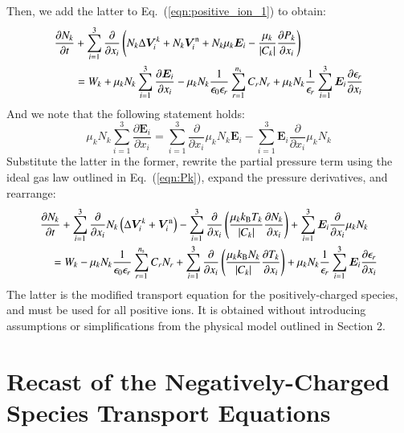 \documentclass{warpdoc}
\newcommand{\alb}{\vspace{0.1cm}\\} %
\newcommand{\mfd}{\displaystyle}
\newcommand{\ns}{{n_{\rm s}}}
\renewcommand{\vec}[1]{\bm{#1}}
\begin{document}
Then, we add the latter to Eq.\ (\ref{eqn:positive_ion_1}) to obtain:
%
\begin{align}
  \frac{\partial N_{k}}{\partial t} &+ \sum_{i=1}^3 \frac{\partial}{\partial x_i} \left(N_k \Delta \vec{V}_i^k +N_{k} \vec{V}^{\rm n}_i+N_{k}  \mu_k  \vec{E}_i
             -    \frac{\mu_k }{|C_{k}| } \frac{\partial P_{k}}{\partial x_i}\right) \nonumber \\
&= W_{k}+\mu_{k} N_{k} \sum_{i=1}^3 \frac{\partial \vec{E}_i}{\partial x_i}-\mu_{k} N_{k}\frac{1}{\epsilon_0 \epsilon_r} \sum_{r=1}^\ns C_r N_r 
+\mu_{k} N_{k}\frac{1}{\epsilon_r} \sum_{i=1}^3 \vec{E}_i \frac{\partial \epsilon_r}{\partial x_i}  
\end{align}
%
And we note that the following statement holds:
%
\begin{equation}
\mu_{k} N_{k} \sum_{i=1}^3 \frac{\partial \vec{E}_i}{\partial x_i}
= \sum_{i=1}^3 \frac{\partial }{\partial x_i} \mu_{k} N_{k} \vec{E}_i
 - \sum_{i=1}^3 \vec{E}_i \frac{\partial }{\partial x_i} \mu_{k} N_{k}
\end{equation}
%
Substitute the latter in the former, rewrite the partial pressure term using the ideal gas law outlined in Eq.\ (\ref{eqn:Pk}), expand the pressure derivatives, and rearrange:
%
\begin{equation}
\begin{array}{l}\mfd
  \frac{\partial N_{k}}{\partial t} 
+ \sum_{i=1}^3 \frac{\partial}{\partial x_i} N_k \left(\Delta \vec{V}_i^k + \vec{V}^{\rm n}_i\right) 
- \sum_{i=1}^3  \frac{\partial}{\partial x_i} \left(
                 \frac{\mu_k k_{\rm B} T_{k}}{|C_{k}| } \frac{\partial N_{k}}{\partial x_i}
\right)
+ \sum_{i=1}^3 \vec{E}_i \frac{\partial }{\partial x_i} \mu_{k} N_{k}
 \alb\mfd~~~~~
= 
 W_{k}
-\mu_{k} N_{k}\frac{1}{\epsilon_0 \epsilon_r} \sum_{r=1}^\ns C_r N_r 
+ \sum_{i=1}^3  \frac{\partial}{\partial x_i} \left(
                 \frac{\mu_k k_{\rm B} N_{k}}{|C_{k}| } \frac{\partial T_{k}}{\partial x_i}
\right)
+\mu_{k} N_{k}\frac{1}{\epsilon_r} \sum_{i=1}^3 \vec{E}_i \frac{\partial \epsilon_r}{\partial x_i}  
\end{array}
\label{eqn:positivespecies}
\end{equation}
%
The latter is the modified transport equation for the positively-charged species, and must be used for all positive ions. It is obtained without introducing assumptions or simplifications from the physical model outlined in Section 2.




\section{Recast of the Negatively-Charged Species Transport Equations}
\end{document}
